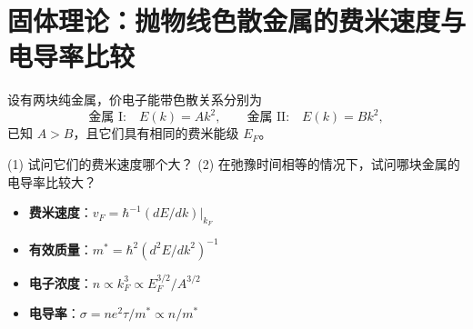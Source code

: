 \section{固体理论：抛物线色散金属的费米速度与电导率比较}
\label{sec:parabolic-fermi-compare}

\begin{modelbox}[题目：两块纯金属的色散关系与输运性质比较]
设有两块纯金属，价电子能带色散关系分别为
\begin{equation}
\text{金属 I:}\quad E(k)=Ak^2,\qquad
\text{金属 II:}\quad E(k)=Bk^2,
\end{equation}
已知 $A>B$，且它们具有相同的费米能级 $E_F$。

(1) 试问它们的费米速度哪个大？
(2) 在弛豫时间相等的情况下，试问哪块金属的电导率比较大？
\end{modelbox}

\begin{tipbox}[考点快速分析]
\begin{itemize}
    \item \textbf{费米速度}：$v_F=\hbar^{-1}(dE/dk)|_{k_F}$
    \item \textbf{有效质量}：$m^*=\hbar^2(d^2E/dk^2)^{-1}$
    \item \textbf{电子浓度}：$n\propto k_F^3\propto E_F^{3/2}/A^{3/2}$
    \item \textbf{电导率}：$\sigma=ne^2\tau/m^*\propto n/m^*$
\end{itemize}
\end{tipbox}

